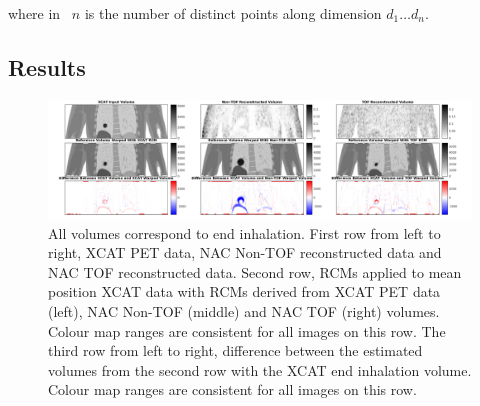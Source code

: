                 \noindent where in~ $n$ is the number of distinct points along dimension $d_1 \dotso d_n$.
            
        \subsection{Results} \label{sec:impact_of_tof_on_respiratory_motion_model_estimation_using_pre_gated_no_intra_cycle_motion_nAC_pet_results}
            \begin{figure}
                \centering
                
                \includegraphics[width=1.0\linewidth]{figures/motion_correction_1_results_1_output.png}
                
                \captionsetup{singlelinecheck=false}
                \caption{
                    All volumes correspond to end inhalation. First row from left to right, \gls{XCAT} \gls{PET} data, \gls{NAC} \gls{Non-TOF} reconstructed data and \gls{NAC} \gls{TOF} reconstructed data. Second row, \glspl{RCM} applied to mean position \gls{XCAT} data with \glspl{RCM} derived from \gls{XCAT} \gls{PET} data (left), \gls{NAC} \gls{Non-TOF} (middle) and \gls{NAC} \gls{TOF} (right) volumes. Colour map ranges are consistent for all images on this row. The third row from left to right, difference between the estimated volumes from the second row with the \gls{XCAT} end inhalation volume. Colour map ranges are consistent for all images on this row.
                }
                \label{fig:impact_of_tof_on_respiratory_motion_model_estimation_using_pre_gated_no_intra_cycle_motion_nAC_pet_results_output}
            \end{figure}
            
